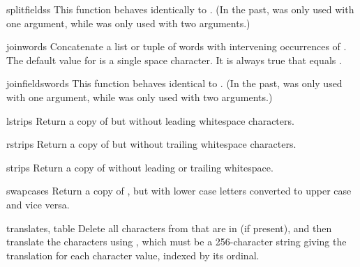 \begin{funcdesc}{splitfields}{s}
  This function behaves identically to .  (In the
  past,  was only used with one argument, while
   was only used with two arguments.)
\end{funcdesc}

\begin{funcdesc}{join}{words}
  Concatenate a list or tuple of words with intervening occurrences of 
  .  The default value for  is a single space
  character.  It is always true that
  equals .
\end{funcdesc}

\begin{funcdesc}{joinfields}{words}
  This function behaves identical to .  (In the past, 
   was only used with one argument, while
   was only used with two arguments.)
\end{funcdesc}

\begin{funcdesc}{lstrip}{s}
  Return a copy of  but without leading whitespace characters.
\end{funcdesc}

\begin{funcdesc}{rstrip}{s}
  Return a copy of  but without trailing whitespace
  characters.
\end{funcdesc}

\begin{funcdesc}{strip}{s}
  Return a copy of  without leading or trailing whitespace.
\end{funcdesc}

\begin{funcdesc}{swapcase}{s}
  Return a copy of , but with lower case letters
  converted to upper case and vice versa.
\end{funcdesc}

\begin{funcdesc}{translate}{s, table}
  Delete all characters from  that are in  (if 
  present), and then translate the characters using , which 
  must be a 256-character string giving the translation for each
  character value, indexed by its ordinal.  
\end{funcdesc}

